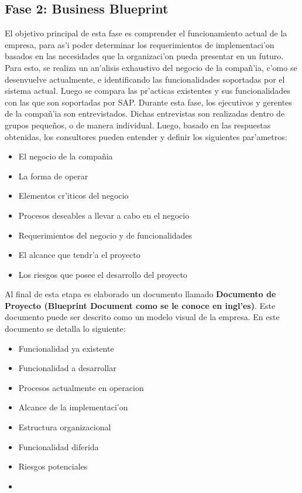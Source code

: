 \subsection{Fase 2: Business Blueprint}
El objetivo principal de esta fase es comprender el funcionamiento actual de la empresa, para as'i poder determinar los requerimientos de implementaci'on basados en las necesidades que la organizaci'on pueda presentar en un futuro. Para esto, se realiza un an'alisis exhaustivo del negocio de la compa\~n'ia, c'omo se desenvuelve actualmente, e identificando las funcionalidades soportadas por el sistema actual. Luego se compara las pr'acticas existentes y sus funcionalidades  con las que son soportadas por SAP. 
Durante esta fase, los ejecutivos y gerentes de la compa\~n'ia son entrevistados. Dichas entrevistas son realizadas dentro de grupos peque\~nos, o de manera individual. Luego, basado en las respuestas obtenidas, los consultores pueden entender y definir los siguientes par'ametros:
\begin{itemize}
\item El negocio de la compa\~nia
\item La forma de operar
\item Elementos cr'iticos del negocio
\item Procesos deseables a llevar a cabo en el negocio
\item Requerimientos del negocio y de funcionalidades
\item El alcance que tendr'a el proyecto
\item Los riesgos que posee el desarrollo del proyecto
\end{itemize}
Al final de esta etapa es elaborado un documento llamado \textbf{Documento de Proyecto (Blueprint Document como se le conoce en ingl'es)}. 
Este documento puede ser descrito como un modelo visual de la empresa. En este documento se detalla lo siguiente:
\begin{itemize}
\item Funcionalidad ya existente
\item Funcionalidad a desarrollar
\item Procesos actualmente en operacion
\item Alcance de la implementaci'on
\item Estructura organizacional
\item Funcionalidad diferida
\item Riesgos potenciales
\item
\end{itemize}
